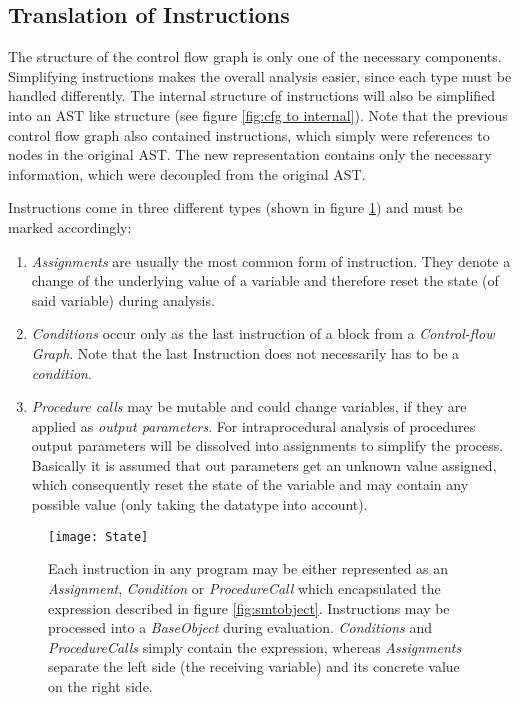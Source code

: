 \subsection{Translation of Instructions}
\label{subsec:translate instructions}
The structure of the control flow graph is only one of the necessary components. 
Simplifying instructions makes the overall analysis easier, since each type must be handled differently.
The internal structure of instructions will also be simplified into an AST like structure (see figure \ref{fig:cfg to internal}). 
Note that the previous control flow graph also contained instructions, which simply were references to nodes in the original AST. 
The new representation contains only the necessary information, which were decoupled from the original AST.

Instructions come in three different types (shown in figure \ref{fig:state}) and must be marked accordingly:
\begin{enumerate}
	\item \emph{Assignments} are usually the most common form of instruction. They denote a change of the underlying value of a variable and therefore reset the state (of said variable) during analysis. 
	\item \emph{Conditions} occur only as the last instruction of a block from a \emph{Control-flow Graph}. Note that the last Instruction does not necessarily has to be a \emph{condition}.
	\item \emph{Procedure calls} may be mutable and could change variables, if they are applied as \emph{output parameters}. %
	For intraprocedural analysis of procedures output parameters will be dissolved into assignments to simplify the process. Basically it is assumed that out parameters get an unknown value assigned, which consequently reset the state of the variable and may contain any possible value (only taking the datatype into account).
\end{enumerate}
\begin{figure}[h!]
	\centering
	\texttt{[image: State]}
	\caption{Each instruction in any program may be either represented as an \emph{Assignment}, \emph{Condition} or \emph{ProcedureCall} which encapsulated the expression described in figure \ref{fig:smtobject}. Instructions may be processed into a \emph{BaseObject} during evaluation. \emph{Conditions} and \emph{ProcedureCalls} simply contain the expression, whereas \emph{Assignments} separate the left side (the receiving variable) and its concrete value on the right side.}
	\label{fig:state}
\end{figure}
